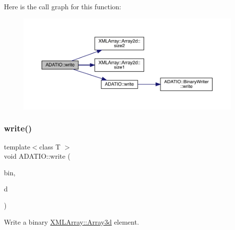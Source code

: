 Here is the call graph for this function\+:
\nopagebreak
\begin{figure}[H]
\begin{center}
\leavevmode
\includegraphics[width=350pt]{d0/dba/namespaceADATIO_a6e67aa5fde8e34135bde219592b6b55a_cgraph}
\end{center}
\end{figure}
\mbox{\label{namespaceADATIO_a7fbf1297a893fe12c3b03b9594408829}} 
\subsubsection{\texorpdfstring{write()}{write()}\hspace{0.1cm}{\footnotesize\ttfamily [18/25]}}
{\footnotesize\ttfamily template$<$class T $>$ \\
void A\+D\+A\+T\+I\+O\+::write (\begin{DoxyParamCaption}\item[{\mbox{\hyperlink{classADATIO_1_1BinaryWriter}{Binary\+Writer}} \&}]{bin,  }\item[{const \mbox{\hyperlink{classXMLArray_1_1Array3d}{X\+M\+L\+Array\+::\+Array3d}}$<$ T $>$ \&}]{d }\end{DoxyParamCaption})\hspace{0.3cm}{\ttfamily [inline]}}



Write a binary \mbox{\hyperlink{classXMLArray_1_1Array3d}{X\+M\+L\+Array\+::\+Array3d}} element. 

